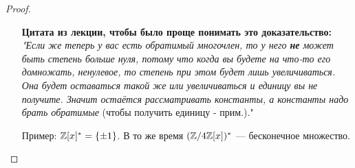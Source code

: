 \begin{normalsize}
\begin{proof}
\begin{itemize}
        \textbf{Цитата из лекции, чтобы было проще понимать это доказательство:} \\
        \emph{"Если же теперь у вас есть обратимый многочлен, то у него \textbf{не} может быть степень больше нуля,
        потому что когда вы будете на что-то его домножать, ненулевое, то степень при этом будет лишь
        увеличиваться. Она будет оставаться такой же или увеличиваться и единицу вы не получите.
        Значит остаётся рассматривать константы, а константы надо брать обратимые}
        (чтобы получить единицу - прим.)."
        \item[Пример:] $\mathbb{Z}[x]^* = \{ \pm 1 \}$. В то же время $(\mathbb{Z} / 4\mathbb{Z} [x])^*$ --- бесконечное множество.
    \end{itemize} 
\end{proof}

\end{normalsize}